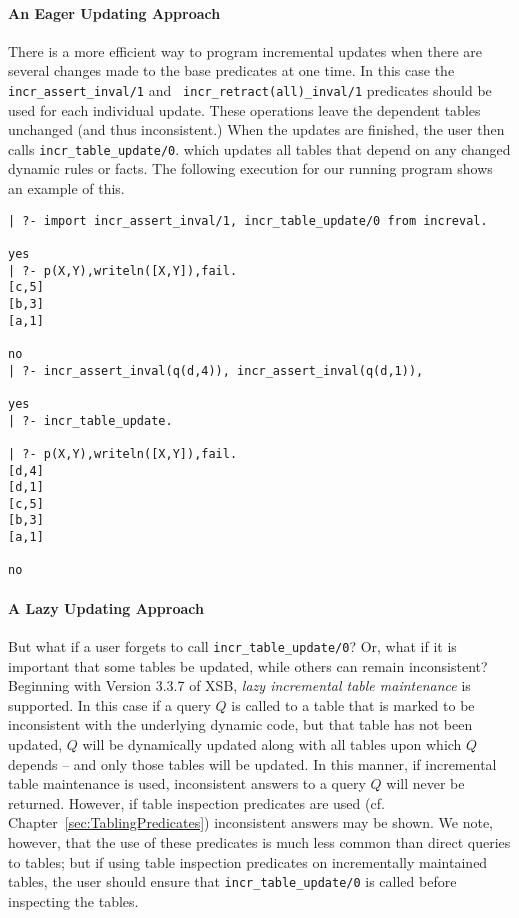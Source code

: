 \paragraph{An Eager Updating Approach}
%
There is a more efficient way to program incremental updates when
there are several changes made to the base predicates at one time.  In
this case the {\tt incr\_assert\_inval/1} and {\tt
  incr\_retract(all)\_inval/1} predicates should be used for each
individual update.  These operations leave the dependent tables
unchanged (and thus inconsistent.)  When the updates are finished, the
user then calls {\tt incr\_table\_update/0}.  which updates all tables
that depend on any changed dynamic rules or facts.  The following
execution for our running program shows an example of this.

\begin{verbatim}
| ?- import incr_assert_inval/1, incr_table_update/0 from increval.

yes
| ?- p(X,Y),writeln([X,Y]),fail.
[c,5]
[b,3]
[a,1]

no
| ?- incr_assert_inval(q(d,4)), incr_assert_inval(q(d,1)), 

yes
| ?- incr_table_update.

| ?- p(X,Y),writeln([X,Y]),fail.
[d,4]
[d,1]
[c,5]
[b,3]
[a,1]

no
\end{verbatim}

\paragraph{A Lazy Updating Approach}
%
But what if a user forgets to call {\tt incr\_table\_update/0}?  Or,
what if it is important that some tables be updated, while others can
remain inconsistent?  Beginning with Version 3.3.7 of XSB, {\em lazy
  incremental table maintenance} is supported.  In this case if a
query $Q$ is called to a table that is marked to be inconsistent with
the underlying dynamic code, but that table has not been updated, $Q$
will be dynamically updated along with all tables upon which $Q$
depends -- and only those tables will be updated.  In this manner, if
incremental table maintenance is used, inconsistent answers to a query
$Q$ will never be returned.  However, if table inspection predicates
are used (cf. Chapter~\ref{sec:TablingPredicates}) inconsistent
answers may be shown.  We note, however, that the use of these
predicates is much less common than direct queries to tables; but if
using table inspection predicates on incrementally maintained tables,
the user should ensure that {\tt incr\_table\_update/0} is called
before inspecting the tables.

